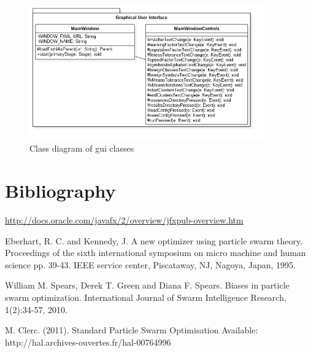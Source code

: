 \documentclass{article}
\begin{document}
\begin{figure}[H]
	\centering
	\includegraphics[width=0.9\textwidth]{images/gui.jpg}
    \caption{Class diagram of gui classes}
    \label{fig:gui_classes}
\end{figure}




\section{Bibliography}

\begin{thebibliography}{1}

 \url{http://docs.oracle.com/javafx/2/overview/jfxpub-overview.htm}	


Eberhart, R. C. and Kennedy, J. A new optimizer using particle swarm theory. Proceedings of the sixth international symposium on micro machine and human science pp. 39-43. IEEE service center, Piscataway, NJ, Nagoya, Japan, 1995.




William M. Spears, Derek T. Green and Diana F. Spears. Biases in particle swarm optimization. International Journal of Swarm Intelligence Research, 1(2):34-57, 2010.




M. Clerc. (2011). Standard Particle Swarm Optimisation Available: http://hal.archives-ouvertes.fr/hal-00764996 

	
\end{thebibliography}
\end{document}

